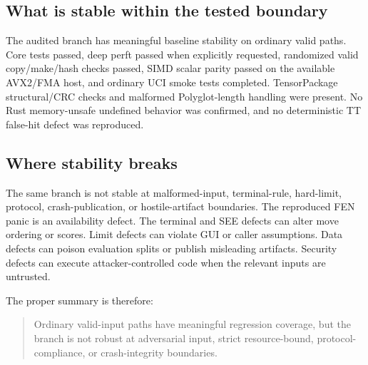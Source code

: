\documentclass[conference]{IEEEtran}
\begin{document}
\subsection{What is stable within the tested boundary}
The audited branch has meaningful baseline stability on ordinary valid paths. Core tests passed, deep perft passed when explicitly requested, randomized valid copy/make/hash checks passed, SIMD scalar parity passed on the available AVX2/FMA host, and ordinary UCI smoke tests completed. TensorPackage structural/CRC checks and malformed Polyglot-length handling were present. No Rust memory-unsafe undefined behavior was confirmed, and no deterministic TT false-hit defect was reproduced.

\subsection{Where stability breaks}
The same branch is not stable at malformed-input, terminal-rule, hard-limit, protocol, crash-publication, or hostile-artifact boundaries. The reproduced FEN panic is an availability defect. The terminal and SEE defects can alter move ordering or scores. Limit defects can violate GUI or caller assumptions. Data defects can poison evaluation splits or publish misleading artifacts. Security defects can execute attacker-controlled code when the relevant inputs are untrusted.

The proper summary is therefore:
\begin{quote}
Ordinary valid-input paths have meaningful regression coverage, but the branch is not robust at adversarial input, strict resource-bound, protocol-compliance, or crash-integrity boundaries.
\end{quote}
\end{document}
